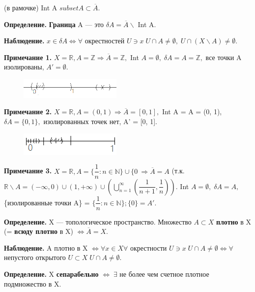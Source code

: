 \documentclass[12pt,a4paper]{article}
\begin{document}
(в рамочке) Int A $subset A \subset \overline{A}.$ 

\textbf{Определение.} \textbf{Граница} A --- это $\delta A = \overline{A} \backslash$ Int A. 

\textbf{Наблюдение.} $x \in \delta A \Leftrightarrow \forall$ окрестностей $U \ni x \; U\cap A \neq \emptyset, \; U \cap (X \backslash A) \neq \emptyset.$

\textbf{Примечание 1.} $X = \mathbb{R}, A = \mathbb{Z} \Rightarrow \overline{A} = \mathbb{Z},$ Int $A = \emptyset, \; \delta A = A = \mathbb{Z},$ все точки A изолированы, $A' = \emptyset.$ 

\begin{figure}
	\includegraphics[width = 5cm]{lect4_1.png}
\end{figure}

\textbf{Примечание 2.} $X = \mathbb{R}, A = (0, 1) \Rightarrow \overline{A} = [0, 1],$ Int A = A = (0, 1), $\delta A = \{0, 1\},$ изолированных точек нет, A' = [0, 1].

\begin{figure}
	\includegraphics[width = 5cm]{lect4_2.png}
\end{figure}

\textbf{Примечание 3.} $X = \mathbb{R}, A = \{\dfrac{1}{n}: n \in \mathbb{N}\} \cup \{0\ \Rightarrow \overline{A} = A$ (т.к. $\mathbb{R} \backslash A = (-\infty, 0) \cup (1, +\infty) \cup (\bigcup^{\infty}_{n = 1} (\dfrac{1}{n + 1}, \dfrac{1}{n})).$ Int $A = \emptyset, \; \delta A = A,$ \{изолированные точки A\} = $\{\dfrac{1}{n}: n \in \mathbb{N}\}; \{0\} = A'.$ 

\textbf{Определение.} X --- топологическое пространство. Множество $A \subset X$ \textbf{плотно} в X (= \textbf{всюду плотно} в X) $\Leftrightarrow \overline{A} = X.$ 

\textbf{Наблюдение.} A плотно в X $\Leftrightarrow \forall x \in X \forall$ окрестности $U \ni x \; U \cap A \neq \emptyset \Leftrightarrow \forall$ непустого открытого $U \subset X \; U \cap A \neq \emptyset.$ 

\textbf{Определение.} X \textbf{сепарабельно} $\Leftrightarrow \; \exists$ не более чем счетное плотное подмножество в X. 
\end{document}
